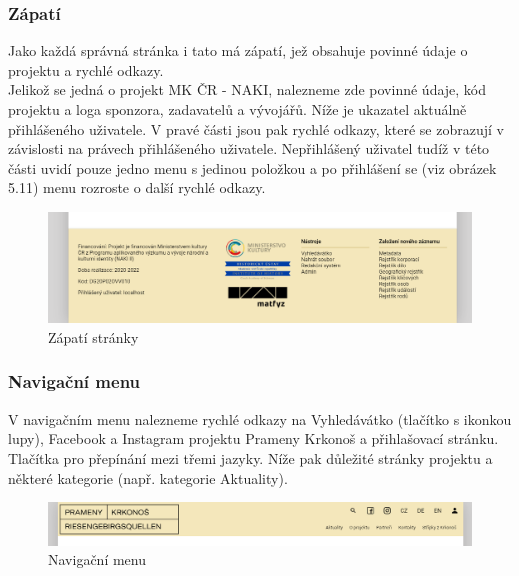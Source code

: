 \subsubsection{Zápatí}
Jako každá správná stránka i tato má zápatí, jež obsahuje povinné údaje o projektu a
rychlé odkazy.\\
Jelikož se jedná o projekt MK ČR - NAKI, nalezneme zde povinné údaje, kód projektu a
loga sponzora, zadavatelů a vývojářů.
Níže je ukazatel aktuálně přihlášeného uživatele.
V pravé části jsou pak rychlé odkazy, které se zobrazují v závislosti na právech přihlášeného uživatele.
Nepřihlášený uživatel tudíž v této části uvidí pouze jedno menu  s jedinou
položkou  a po přihlášení se (viz obrázek 5.11) menu rozroste o další rychlé odkazy.
\begin{figure}[H]
	\centering
	\includegraphics[width=.8\linewidth]{img/zapati.png}
	\caption{Zápatí stránky}
\end{figure}

\subsubsection{Navigační menu}
V navigačním menu nalezneme rychlé odkazy na Vyhledávátko (tlačítko s ikonkou lupy),
Facebook a Instagram projektu Prameny Krkonoš a přihlašovací stránku. Tlačítka pro
přepínání mezi třemi jazyky. Níže pak důležité stránky projektu a některé kategorie
(např. kategorie Aktuality).
\begin{figure}[H]
	\centering
	\includegraphics[width=.8\linewidth]{img/navigationBar.png}
	\caption{Navigační menu}
\end{figure}

